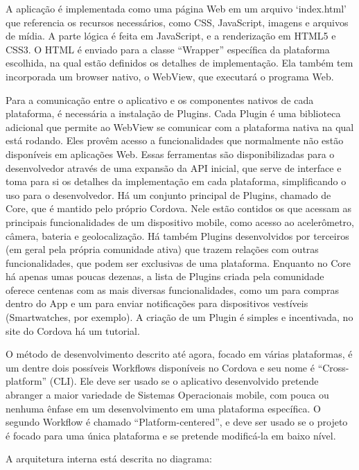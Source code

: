 \documentclass[a4paper,12pt]{article}
\begin{document}
A aplicação é implementada como uma página Web em um arquivo ‘index.html’ que referencia os recursos necessários, como CSS, JavaScript, imagens e arquivos de mídia. A parte lógica é feita em JavaScript, e a renderização em HTML5 e CSS3. O HTML é enviado para a classe “Wrapper” específica da plataforma escolhida, na qual estão definidos os detalhes de implementação. Ela também tem incorporada um browser nativo, o WebView, que executará o programa Web.


Para a comunicação entre o aplicativo e os componentes nativos de cada plataforma, é necessária a instalação de Plugins.
Cada Plugin é uma biblioteca adicional que permite ao WebView se comunicar com a plataforma nativa na qual está rodando. Eles provêm acesso a funcionalidades que normalmente não estão disponíveis em aplicações Web. Essas ferramentas são disponibilizadas para o desenvolvedor através de uma expansão da API inicial, que serve de interface e toma para si os detalhes da implementação em cada plataforma, simplificando o uso para o desenvolvedor.
Há um conjunto principal de Plugins, chamado de Core, que é mantido pelo próprio Cordova. Nele estão contidos os que acessam as principais funcionalidades de um dispositivo mobile, como acesso ao acelerômetro, câmera, bateria e geolocalização.
Há também Plugins desenvolvidos por terceiros (em geral pela própria comunidade ativa) que trazem relações com outras funcionalidades, que podem ser exclusivas de uma plataforma. Enquanto no Core há apenas umas poucas dezenas, a lista de Plugins criada pela comunidade oferece centenas com as mais diversas funcionalidades, como um para compras dentro do App e um para enviar notificações para dispositivos vestíveis (Smartwatches, por exemplo). A criação de um Plugin é simples e incentivada, no site do Cordova há um tutorial.


  O método de desenvolvimento descrito até agora, focado em várias plataformas, é um dentre dois possíveis Workflows disponíveis no Cordova e seu nome é “Cross-platform” (CLI). Ele deve ser usado se o aplicativo desenvolvido pretende abranger a maior variedade de Sistemas Operacionais mobile, com pouca ou nenhuma ênfase em um desenvolvimento em uma plataforma específica.
  O segundo Workflow é chamado “Platform-centered”, e deve ser usado se o projeto é focado para uma única plataforma e se pretende modificá-la em baixo nível.


  A arquitetura interna está descrita no diagrama:

\end{document}
